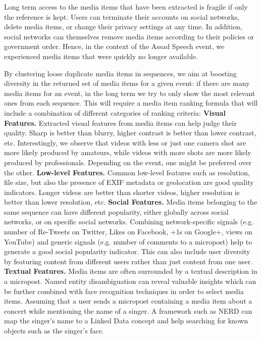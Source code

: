 Long term access to the media items that have been extracted is fragile if only the reference is kept. Users can terminate their accounts on social networks,
delete media items, or change their privacy settings at any time. In addition, social networks can themselves remove media items according to their policies or government order. Hence, in the context of the Assad Speech event, we experienced media items that were quickly no longer available.

By clustering loose duplicate media items in sequences, we aim at boosting diversity in the returned set of media items for a given event: if there are many media items for an event, in the long term we try to only show the most relevant ones from each sequence. This will require a media item ranking formula that will include a combination of different categories of ranking criteria:
\newline
\textbf{Visual Features.} Extracted visual features from media items can help judge their quality. Sharp is better than blurry, higher contrast is better than lower contrast, etc. Interestingly, we observe that videos with less or just one camera shot are more likely produced by amateurs, while videos with more shots are more likely produced by professionals. Depending on the event, one might be preferred over the other.
\newline
\textbf{Low-level Features.} Common low-level features such as resolution, file size, but also the presence of EXIF metadata or geolocation are good quality indicators. Longer videos are better than shorter videos, higher resolution is better than lower resolution, etc.
\newline
\textbf{Social Features.} Media items belonging to the same sequence can have different popularity, either globally across social networks, or on specific social networks. Combining network-specific signals (e.g. number of Re-Tweets on Twitter, Likes on Facebook, +1s on Google+, views on YouTube) and generic signals (e.g. number of comments to a micropost) help to generate a good social popularity indicator. This can also include user diversity by featuring content from different users rather than just content from one user.
\newline
\textbf{Textual Features.} Media items are often surrounded by a textual description in a micropost. Named entity disambiguation can reveal valuable insights which can be further combined with face recognition techniques in order to select media items. Assuming that a user sends a micropost containing a media item about a concert while mentioning the name of a singer. A framework such as NERD can map the singer's name to a Linked Data concept and help searching for known objects such as the singer's face.


